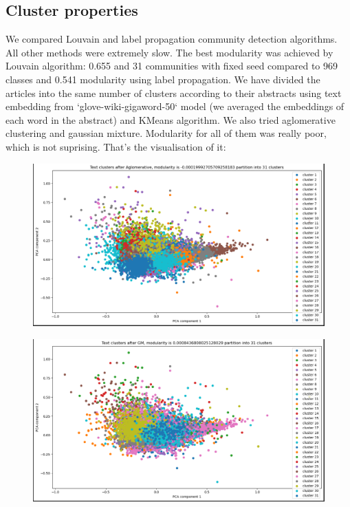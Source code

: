 \documentclass{article}
\begin{document}
\subsection{Cluster properties}
We compared Louvain and label propagation community detection algorithms. All other methods were extremely slow. The best modularity was achieved by Louvain algorithm: 0.655 and 31 communities with fixed seed compared to 969 classes and 0.541 modularity using label propagation. We have divided the articles into the same number of clusters according to their abstracts using text embedding from `glove-wiki-gigaword-50` model (we averaged the embeddings of each word in the abstract) and KMeans algorithm. We also tried aglomerative clustering and gaussian mixture. Modularity for all of them was really poor, which is not suprising. That's the visualisation of it:
\begin{figure}[h]
\centering
\includegraphics[width=1\linewidth]{Aglomerative.png}
\end{figure}
\begin{figure}[h]
\centering
\includegraphics[width=1\linewidth]{gm.png}
\end{figure}
\end{document}
